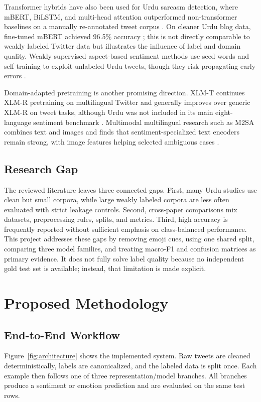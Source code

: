 \documentclass[conference]{IEEEtran}
\begin{document}
Transformer hybrids have also been used for Urdu sarcasm detection, where mBERT, BiLSTM, and multi-head attention outperformed non-transformer baselines on a manually re-annotated tweet corpus \cite{hassan2024sarcasm}. On cleaner Urdu blog data, fine-tuned mBERT achieved 96.5\% accuracy \cite{saeed2024indepth}; this is not directly comparable to weakly labeled Twitter data but illustrates the influence of label and domain quality. Weakly supervised aspect-based sentiment methods use seed words and self-training to exploit unlabeled Urdu tweets, though they risk propagating early errors \cite{zoya2023weakly}.

Domain-adapted pretraining is another promising direction. XLM-T continues XLM-R pretraining on multilingual Twitter and generally improves over generic XLM-R on tweet tasks, although Urdu was not included in its main eight-language sentiment benchmark \cite{barbieri2022xlmt}. Multimodal multilingual research such as M2SA combines text and images and finds that sentiment-specialized text encoders remain strong, with image features helping selected ambiguous cases \cite{thakkar2024m2sa}.

\subsection{Research Gap}
The reviewed literature leaves three connected gaps. First, many Urdu studies use clean but small corpora, while large weakly labeled corpora are less often evaluated with strict leakage controls. Second, cross-paper comparisons mix datasets, preprocessing rules, splits, and metrics. Third, high accuracy is frequently reported without sufficient emphasis on class-balanced performance. This project addresses these gaps by removing emoji cues, using one shared split, comparing three model families, and treating macro-F1 and confusion matrices as primary evidence. It does not fully solve label quality because no independent gold test set is available; instead, that limitation is made explicit.

\section{Proposed Methodology}

\subsection{End-to-End Workflow}
Figure~\ref{fig:architecture} shows the implemented system. Raw tweets are cleaned deterministically, labels are canonicalized, and the labeled data is split once. Each example then follows one of three representation/model branches. All branches produce a sentiment or emotion prediction and are evaluated on the same test rows.
\end{document}
